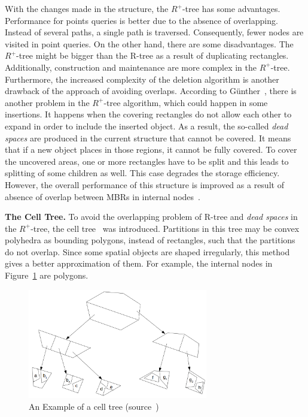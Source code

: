 \documentclass[a4paper,12pt]{article}
\begin{document}
With the changes made in the structure, the $R^+$-tree has some advantages. Performance for points
queries is better due to the absence of overlapping. Instead of several paths, a single path is traversed. Consequently, fewer nodes are visited in point queries. On the other hand, there are some disadvantages. 
The {$R^+$-tree} might be bigger than the R-tree as a result of duplicating rectangles. Additionally, construction and maintenance are more complex in the {$R^+$-tree}. Furthermore, the increased complexity of the deletion algorithm is another drawback of the approach of avoiding overlaps. 
According to G{\"u}nther~\cite{efficientstruct}, there is another problem in the {$R^+$-tree} algorithm, which could happen in some insertions. It happens when the covering rectangles do not allow each other to expand in order to include the inserted object. As a result, the so-called \textit{dead spaces} are produced in the current structure that cannot be covered. It means that if a new object places in those regions, it cannot be fully covered. To cover the uncovered areas, one or more rectangles have to be split and this leads to splitting of some children as well. This case degrades the storage efficiency. %
However, the overall performance of this structure is improved as a result of absence of overlap between MBRs in internal nodes~\cite{Papadopoulos2010}.

\textbf{The Cell Tree.}
To avoid the overlapping problem of R-tree and \textit{dead spaces} in the $R^+$-tree, the cell tree~\cite{celltree} was introduced. Partitions in this tree may be convex polyhedra as bounding polygons, instead of rectangles, such that the partitions do not overlap. 
Since some spatial objects are shaped irregularly, this method gives a better approximation of them.
For example, the internal nodes in Figure~\ref{figcelltree} are polygons. 
\begin{figure}
\centering
\includegraphics[width=0.7\textwidth]{CellTree}
\caption{An Example of a cell tree (source~\cite{survey})}
\label{figcelltree}
\end{figure} 
\end{document}
